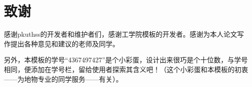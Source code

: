 \chapter{致谢}
\setlength{\parskip}{0pt}

感谢pkuthss的开发者和维护者们，感谢工学院模板的开发者。感谢为本人论文写作提出各种意见和建议的老师及同学。

另外，本模板的学号“4367497427”是个小彩蛋，设计出来很巧是个十位数，与学号相同，便添加在学号栏，留给使用者探索其含义吧！（这个小彩蛋和本模板的初衷——为地物专业的同学服务——有关）。
